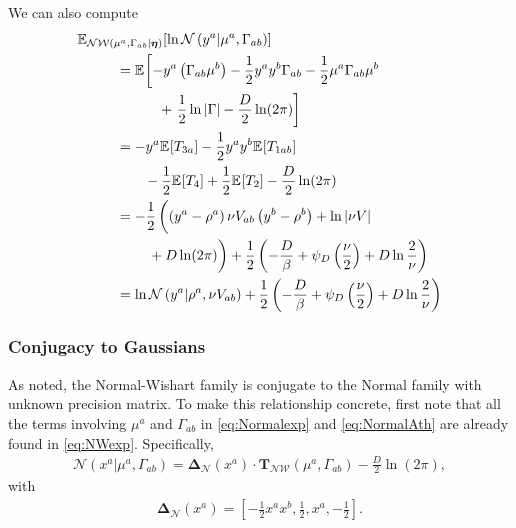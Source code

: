\documentclass[aps,showpacs,twocolumn,prd,superscriptaddress,nofootinbib]{revtex4}
\newcommand{\nn}{\nonumber}
\newcommand{\E}[1]{{\mathbb E}_{#1}\!}
\begin{document}
We can also compute
\begin{align}
  \E{\mathcal {NW}\left(\mu^a,\Gamma_{ab}|\bm\eta\right)}\left[\ln\mathcal{N}\left(y^a|\mu^a,\Gamma_{ab}\right)\right]\mkern-200mu &\mkern200mu\nn\\
  &=\E{}\left[-y^a\left(\Gamma_{ab}\mu^b\right) -\frac12 y^ay^b \Gamma_{ab} -\frac12 \mu^a\Gamma_{ab}\mu^b\right.\nn\\
    &\qquad\quad+\left.\frac12\ln\left|\Gamma\right|-\frac D2\ln(2\pi)  \right]\nn\\
  &=-y^a\E{}\left[T_{3a}\right] -\frac12 y^ay^b\E{}\left[T_{1ab}\right]\nn\\
  &\qquad-\frac12 \E{}\left[T_4\right]+\frac12\E{}\left[T_2\right]-\frac D2\ln(2\pi)\nn\\
  &=-\frac12\left(\left(y^a-\rho^a\right)\nu V_{ab}\left(y^b-\rho^b\right)+ \ln\left|\nu V\right|\vphantom{\frac12}\right.\nn\\
  &\qquad\left.\vphantom{\frac12}+D\ln(2\pi)\right)+\frac12\left(-\frac D\beta+\psi_D\left(\frac\nu2\right)+D\ln\frac2\nu \right)\nn\\
  &=\ln\mathcal{N}\left(y^a|\rho^a,\nu V_{ab}\right)+\frac12\left(-\frac D\beta+\psi_D\left(\frac\nu2\right)+D\ln\frac2\nu \right)\label{eq:ENWoflogN}
\end{align}

\subsubsection{Conjugacy to Gaussians}
As noted, the Normal-Wishart family is conjugate to the Normal family with unknown precision matrix.  To make this relationship concrete, first note that all the terms involving $\mu^a$ and $\Gamma_{ab}$ in \eqref{eq:Normalexp} and \eqref{eq:NormalAth} are already found in \eqref{eq:NWexp}.  Specifically,
\begin{align*}
  \mathcal{N}(x^a|\mu^a,\Gamma_{ab})=\bm\Delta_{\mathcal{N}}(x^a)\cdot\bm T_{\mathcal{NW}}(\mu^a,\Gamma_{ab})-\frac D2\ln({2\pi}),
\end{align*}
with
\begin{align}
  \bm\Delta_{\mathcal{N}}(x^a)=\left[-\frac12x^ax^b,\frac12, x^a,-\frac12\right].\label{eq:NormalDelta}
\end{align}
\end{document}
